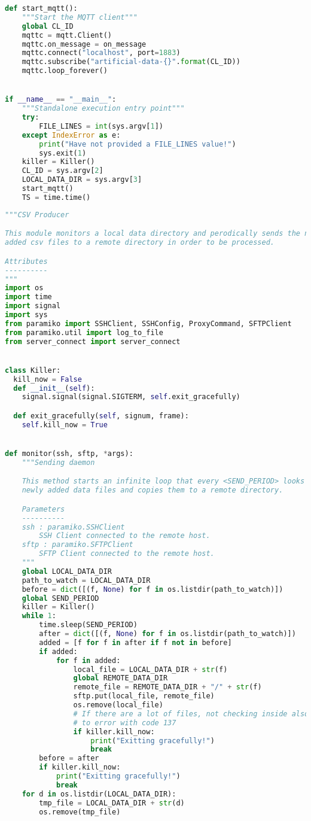 \begin{lstlisting}[language=Python,caption={Implementation of the \texttt{mqtt-subscriber} service.},label=code:mqtt-sub]
def start_mqtt():
    """Start the MQTT client"""
    global CL_ID
    mqttc = mqtt.Client()
    mqttc.on_message = on_message
    mqttc.connect("localhost", port=1883)
    mqttc.subscribe("artificial-data-{}".format(CL_ID))
    mqttc.loop_forever()


if __name__ == "__main__":
    """Standalone execution entry point"""
    try:
        FILE_LINES = int(sys.argv[1])
    except IndexError as e:
        print("Have not provided a FILE_LINES value!")
        sys.exit(1)
    killer = Killer()
    CL_ID = sys.argv[2]
    LOCAL_DATA_DIR = sys.argv[3]
    start_mqtt()
    TS = time.time()
\end{lstlisting}

\begin{lstlisting}[language=Python,caption={Implementation of the \texttt{producer} service.},label=code:producer]
"""CSV Producer

This module monitors a local data directory and perodically sends the newly
added csv files to a remote directory in order to be processed.

Attributes
----------
"""
import os
import time
import signal
import sys
from paramiko import SSHClient, SSHConfig, ProxyCommand, SFTPClient
from paramiko.util import log_to_file
from server_connect import server_connect


class Killer:
  kill_now = False
  def __init__(self):
    signal.signal(signal.SIGTERM, self.exit_gracefully)

  def exit_gracefully(self, signum, frame):
    self.kill_now = True


def monitor(ssh, sftp, *args):
    """Sending daemon

    This method starts an infinite loop that every <SEND_PERIOD> looks for
    newly added data files and copies them to a remote directory.

    Parameters
    ----------
    ssh : paramiko.SSHClient
        SSH Client connected to the remote host.
    sftp : paramiko.SFTPClient
        SFTP Client connected to the remote host.
    """
    global LOCAL_DATA_DIR
    path_to_watch = LOCAL_DATA_DIR
    before = dict([(f, None) for f in os.listdir(path_to_watch)])
    global SEND_PERIOD
    killer = Killer()
    while 1:
        time.sleep(SEND_PERIOD)
        after = dict([(f, None) for f in os.listdir(path_to_watch)])
        added = [f for f in after if f not in before]
        if added:
            for f in added:
                local_file = LOCAL_DATA_DIR + str(f)
                global REMOTE_DATA_DIR
                remote_file = REMOTE_DATA_DIR + "/" + str(f)
                sftp.put(local_file, remote_file)
                os.remove(local_file)
                # If there are a lot of files, not checking inside also leads
                # to error with code 137
                if killer.kill_now:
                    print("Exitting gracefully!")
                    break
        before = after
        if killer.kill_now:
            print("Exitting gracefully!")
            break
    for d in os.listdir(LOCAL_DATA_DIR):
        tmp_file = LOCAL_DATA_DIR + str(d)
        os.remove(tmp_file)



\end{lstlisting}
